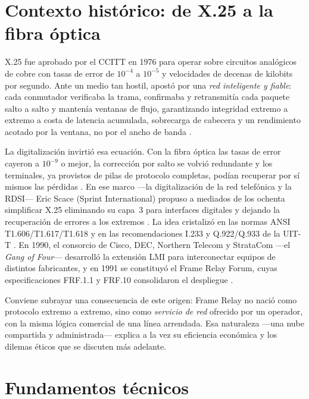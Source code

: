\documentclass[12pt,a4paper]{article}
\begin{document}
\section{Contexto histórico: de X.25 a la fibra óptica}

X.25 fue aprobado por el CCITT en 1976 para operar sobre circuitos analógicos de cobre con tasas de error de $10^{-4}$ a $10^{-5}$ y velocidades de decenas de kilobits por segundo. Ante un medio tan hostil, apostó por una \emph{red inteligente y fiable}: cada conmutador verificaba la trama, confirmaba y retransmitía cada paquete salto a salto y mantenía ventanas de flujo, garantizando integridad extremo a extremo a costa de latencia acumulada, sobrecarga de cabecera y un rendimiento acotado por la ventana, no por el ancho de banda \cite{rybczynski1980, itux25, tanenbaum2012}.

La digitalización invirtió esa ecuación. Con la fibra óptica las tasas de error cayeron a $10^{-9}$ o mejor, la corrección por salto se volvió redundante y los terminales, ya provistos de pilas de protocolo completas, podían recuperar por sí mismos las pérdidas \cite{stallings2014}. En ese marco ---la digitalización de la red telefónica y la RDSI--- Eric Scace (Sprint International) propuso a mediados de los ochenta simplificar X.25 eliminando su capa~3 para interfaces digitales y dejando la recuperación de errores a los extremos \cite{buckwalter1999}. La idea cristalizó en las normas ANSI T1.606/T1.617/T1.618 y en las recomendaciones I.233 y Q.922/Q.933 de la UIT-T \cite{ansi1617, itui233, ituq922}. En 1990, el consorcio de Cisco, DEC, Northern Telecom y StrataCom ---el \emph{Gang of Four}--- desarrolló la extensión LMI para interconectar equipos de distintos fabricantes, y en 1991 se constituyó el Frame Relay Forum, cuyas especificaciones FRF.1.1 y FRF.10 consolidaron el despliegue \cite{frf1, frf10, cisco}.

Conviene subrayar una consecuencia de este origen: Frame Relay no nació como protocolo extremo a extremo, sino como \emph{servicio de red} ofrecido por un operador, con la misma lógica comercial de una línea arrendada. Esa naturaleza ---una nube compartida y administrada--- explica a la vez su eficiencia económica y los dilemas éticos que se discuten más adelante.

\section{Fundamentos técnicos}
\end{document}
